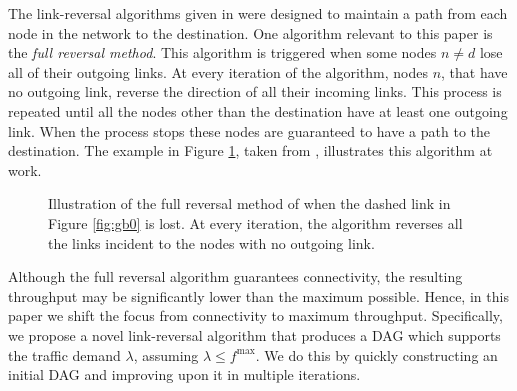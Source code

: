 \documentclass{sig-alternate-2013}
\begin{document}
The link-reversal algorithms given in \cite{gafni_bertsekas} were designed to maintain a path from each node in the network to the destination. One algorithm relevant to this paper is  the \emph{full reversal method}. This algorithm is triggered when some nodes $n \ne d$ lose all of their outgoing links. At every iteration of the algorithm, nodes $n$, that have no outgoing link, reverse the direction of all their incoming links. This process is repeated until all the nodes other than the destination have at least one outgoing link. When the process stops these nodes are guaranteed to have a path to the destination.
The example in Figure \ref{fig:gb_example}, taken from \cite{gafni_bertsekas}, illustrates this algorithm at work. 
\begin{figure}[h!]
\centering
{}
\caption{Illustration of the full reversal method of \cite{gafni_bertsekas} when the dashed link in Figure \ref{fig:gb0}  is lost. At every iteration, the algorithm reverses all the links incident to the nodes with no outgoing link.}
\label{fig:gb_example}
\end{figure}


Although the full reversal algorithm guarantees connectivity, the resulting throughput may be significantly lower than the maximum possible. Hence, in this paper we shift the focus from connectivity to maximum throughput. Specifically, we propose a novel link-reversal algorithm that produces a DAG which supports the traffic demand $\lambda$, assuming $\lambda \le f^{\max}$. We do this by quickly constructing an initial DAG and improving upon it in multiple iterations.
\end{document}
